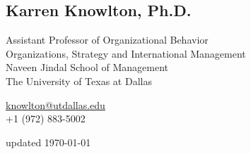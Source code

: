 \documentclass[12pt,letterpaper]{report} %
\begin{document}
    \subsection*{Karren Knowlton, Ph.D.}
        \begin{minipage}[t]{0.700\textwidth}
        Assistant Professor of Organizational Behavior\\
        Organizations, Strategy and International Management\\
        Naveen Jindal School of Management\\
        The University of Texas at Dallas
        \end{minipage}
        \begin{minipage}[t]{0.295\textwidth}
        \flushright{}
        \href{mailto:knowlton@utdallas.edu}{knowlton@utdallas.edu} \\
        +1 (972) 883-5002
        \end{minipage}

        
    \begin{center}
       \vfill
        updated \monthyeardate\today
    \end{center}
\end{document}
